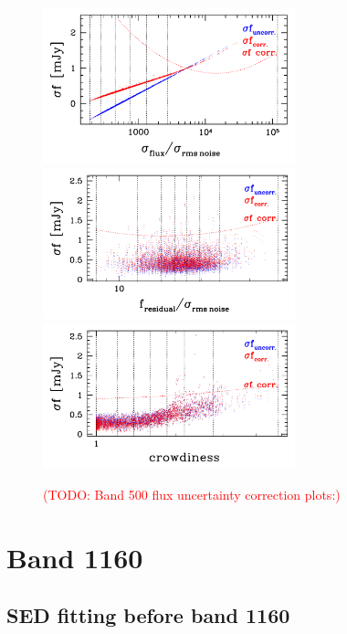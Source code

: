 \documentclass[11pt,a4paper]{article}
\begin{document}
\begin{figure}[H]
	\caption{
		\textcolor{red}{(TODO: Band 500 flux uncertainty correction plots:)}
	}
	\includegraphics[width=0.65\textwidth]{galsim_500_dfcorr_1}
	\includegraphics[width=0.65\textwidth]{galsim_500_dfcorr_2}
	\includegraphics[width=0.65\textwidth]{galsim_500_dfcorr_3}
\end{figure}


\clearpage

\section{Band 1160}

\subsection{SED fitting before band 1160}
\label{Band1160_Galsed}
\end{document}
